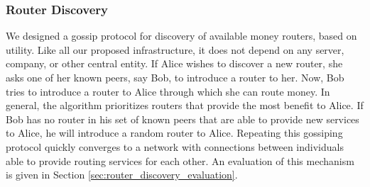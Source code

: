 \subsubsection*{Router Discovery}
\label{sec:peer_discovery}
We designed a gossip protocol for discovery of available money routers, based on utility.
Like all our proposed infrastructure, it does not depend on any server, company, or other central entity.
If Alice wishes to discover a new router, she asks one of her known peers, say Bob, to introduce a router to her.
Now, Bob tries to introduce a router to Alice through which she can route money. %
In general, the algorithm prioritizes routers that provide the most benefit to Alice.
If Bob has no router in his set of known peers that are able to provide new services to Alice, he will introduce a random router to Alice.
Repeating this gossiping protocol quickly converges to a network with connections between individuals able to provide routing services for each other.
An evaluation of this mechanism is given in Section \ref{sec:router_discovery_evaluation}.

